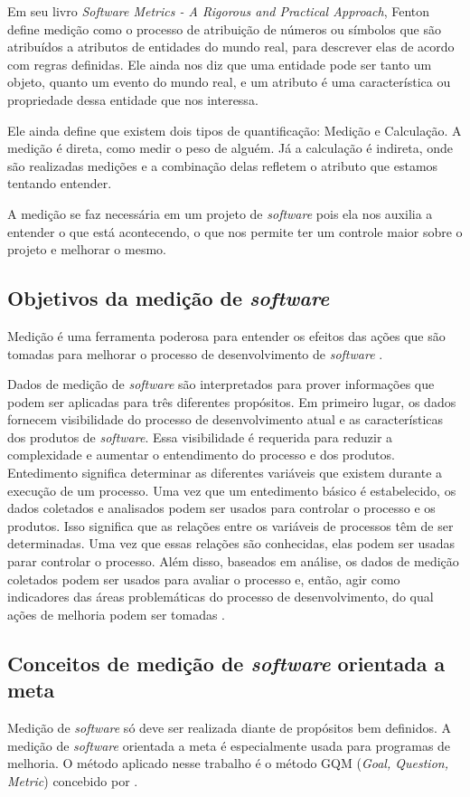 Em seu livro \textit{Software Metrics - A Rigorous and Practical Approach}, Fenton define
medição como o processo de atribuição de números ou símbolos que são atribuídos
a atributos de entidades do mundo real, para descrever elas de acordo com regras
definidas. Ele ainda nos diz que uma entidade pode ser tanto um objeto, quanto
um evento do mundo real, e um atributo é uma característica ou propriedade dessa
entidade que nos interessa.

Ele ainda define que existem dois tipos de quantificação: Medição e Calculação.
A medição é direta, como medir o peso de alguém. Já a calculação é indireta, onde
são realizadas medições e a combinação delas refletem o atributo que estamos
tentando entender.

A medição se faz necessária em um projeto de \textit{software} pois ela nos auxilia a
entender o que está acontecendo, o que nos permite ter um controle maior sobre o
projeto e melhorar o mesmo.

\subsection{Objetivos da medição de \textit{software}}
Medição é uma ferramenta poderosa para entender os efeitos das ações que são
tomadas para melhorar o processo de desenvolvimento de \textit{software}
\cite{egon}.

Dados de medição de \textit{software} são interpretados para prover informações que podem
ser aplicadas para três diferentes propósitos. Em primeiro lugar, os dados
fornecem visibilidade do processo de desenvolvimento atual e as características
dos produtos de \textit{software}. Essa visibilidade é requerida para reduzir a complexidade
e aumentar o entendimento do processo e dos produtos. Entedimento significa
determinar as diferentes variáveis que existem durante a execução de um processo.
Uma vez que um entedimento básico é estabelecido, os dados coletados e analisados
podem ser usados para controlar o processo e os produtos. Isso significa que as
relações entre os variáveis de processos têm de ser determinadas. Uma vez que
 essas relações são conhecidas, elas podem ser usadas parar controlar o processo.
 Além disso, baseados em análise, os dados de medição coletados podem ser usados
 para avaliar o processo e, então, agir como indicadores das áreas problemáticas
 do processo de desenvolvimento, do qual ações de melhoria podem ser tomadas
 \cite{pfleeger}.

\subsection{Conceitos de medição de \textit{software} orientada a meta}
Medição de \textit{software} só deve ser realizada diante de propósitos bem definidos.
A medição de \textit{software} orientada a meta é especialmente usada para programas de
 melhoria. O método aplicado nesse trabalho é o método GQM (\textit{Goal, Question, Metric})
 concebido por \cite{basiliRombach}.


